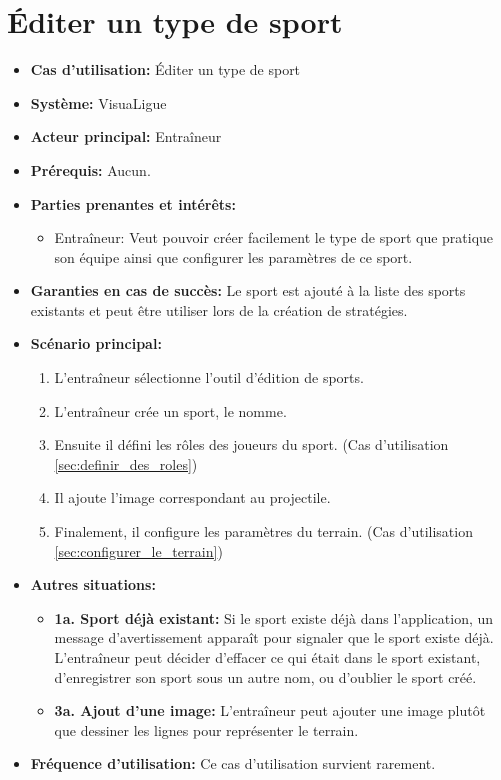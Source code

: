 \section{Éditer un type de sport}
\label{sec:ajouter_un_type_de_sport}

\begin{itemize}
    \item \textbf{Cas d'utilisation:} Éditer un type de sport
    \item \textbf{Syst\`eme:} VisuaLigue
    \item \textbf{Acteur principal:} Entra\^ineur
    \item \textbf{Pr\'erequis:} Aucun.
    \item \textbf{Parties prenantes et int\'er\^ets:}
        \begin{itemize}
            \item Entraîneur: Veut pouvoir cr\'eer facilement le type de sport que pratique son équipe ainsi que configurer les paramètres de ce sport.
        \end{itemize}
    \item \textbf{Garanties en cas de succ\`es:} Le sport est ajout\'e \`a la liste des sports existants et peut \^etre utiliser lors de la cr\'eation de strat\'egies.
    \item \textbf{Sc\'enario principal:}
        \begin{enumerate}
        	\item L'entraîneur sélectionne l'outil d'édition de sports.
            \item L'entra\^ineur cr\'ee un sport, le nomme.
            \item Ensuite il défini les r\^oles des joueurs du sport. (Cas d'utilisation \ref{sec:definir_des_roles})
            \item Il ajoute l'image correspondant au projectile.
            \item Finalement, il configure les paramètres du terrain. (Cas d'utilisation \ref{sec:configurer_le_terrain})
        \end{enumerate}
    \item \textbf{Autres situations:}
        \begin{itemize}
            \item \textbf{1a. Sport d\'ej\`a existant:} Si le sport existe d\'ej\`a dans l'application, un message d'avertissement appara\^it pour signaler que le sport existe d\'ej\`a.
                L'entraîneur peut d\'ecider d'effacer ce qui \'etait dans le sport existant, d'enregistrer son sport sous un autre nom, ou d'oublier le sport cr\'e\'e.
            \item \textbf{3a. Ajout d'une image:} L'entraîneur peut ajouter une image plutôt que dessiner les lignes pour représenter le terrain.
        \end{itemize}
    \item \textbf{Fréquence d'utilisation:} Ce cas d'utilisation survient rarement.
\end{itemize}



